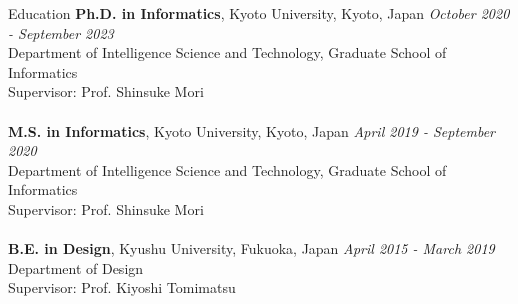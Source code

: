 \begin{rSection}{Education}
{\bf Ph.D. in Informatics}, Kyoto University, Kyoto, Japan \hfill {\em October 2020 - September 2023}
\\ Department of Intelligence Science and Technology, Graduate School of Informatics
\\Supervisor: Prof. Shinsuke Mori\\ \vspace{-0.5em}
\\{\bf M.S. in Informatics}, Kyoto University, Kyoto, Japan \hfill {\em April 2019 - September 2020} 
\\ Department of Intelligence Science and Technology, Graduate School of Informatics
\\ Supervisor: Prof. Shinsuke Mori\\ \vspace{-0.5em}
\\{\bf B.E. in Design}, Kyushu University, Fukuoka, Japan \hfill {\em April 2015 - March 2019}
\\ Department of Design
\\ Supervisor: Prof. Kiyoshi Tomimatsu
\end{rSection}
\vspace{-0.5em}